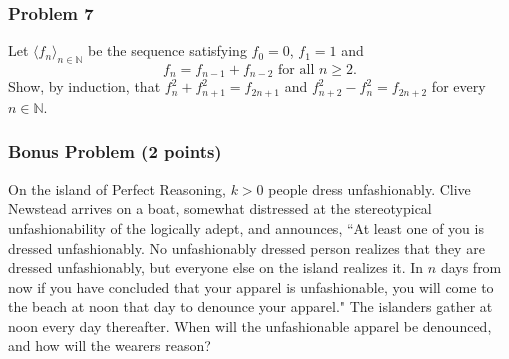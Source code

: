\documentclass[11pt,onecolumn,fleqn]{article}
\theoremstyle{definition}
\begin{document}
\subsubsection*{Problem 7}
Let $\langle f_n \rangle_{n \in \mathbb{N}}$ be the sequence satisfying
$f_0 = 0$, $f_1 = 1$ and 
$$f_n = f_{n-1} + f_{n-2} \text{ for all } n \ge 2.$$
Show, by induction, that $f^2_n + f^2_{n+1} = f_{2n+1}$ and
$f^2_{n+2} - f^2_n = f_{2n+2}$ for every $n \in \mathbb{N}$.


\subsubsection*{Bonus Problem  (2 points)}
On the island of Perfect Reasoning, $k > 0$ people dress unfashionably. 
Clive Newstead arrives on a boat, somewhat distressed at the stereotypical 
unfashionability of the logically adept, and announces, ``At least one of you is dressed 
unfashionably. No unfashionably dressed person realizes that they are dressed 
unfashionably, but everyone else on the island realizes it. In $n$ days from now 
if you have concluded that your apparel is unfashionable, you will come to the beach 
at noon that day to denounce your apparel." The islanders gather at noon every day 
thereafter. When will the unfashionable apparel be denounced, and how will the 
wearers reason?
\end{document}
